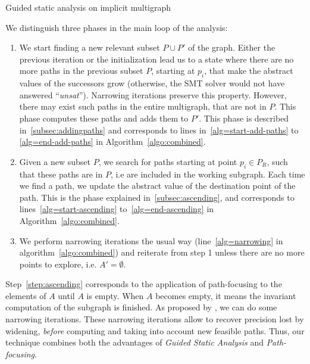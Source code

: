 \documentclass[preprint]{sigplanconf}
\newcommand{\MM}[1]{{\color{blue} TODO(MM): #1}}
\begin{document}
\begin{algorithm}
	\caption{Guided static analysis on implicit multigraph}
	\label{algo:combined}
	\begin{algorithmic}[1] 
	
	\end{algorithmic}
\end{algorithm}


We distinguish three phases in the main loop of the analysis:
\begin{enumerate}
\item \label{step:addingpaths} We start finding a new relevant subset
  $P \cup P'$ of the graph.
  Either the previous iteration or the initialization lead us to a
  state where there are no more paths in the previous subset $P$,
  starting at $p_i$, that make the abstract values of the successors
  grow (otherwise, the SMT solver would not have answered
  ``\emph{unsat}''). Narrowing iterations preserve this property.
  However, there may exist such paths in the entire multigraph, that
  are not in $P$. This phase computes these paths and adds them to
  $P'$. This phase is described in~\ref{subsec:addingpaths}
  and corresponds to lines in~\ref{alg=start-add-paths} to
  \ref{alg=end-add-paths} in Algorithm~\ref{algo:combined}.
\item \label{step:ascending} Given a new subset $P$, we search for paths starting at point
  $p_i \in P_R$, such that these paths are in $P$, i.e are included in
  the working subgraph. Each time we find a path, we update the
  abstract value of the destination point of the path. This is the
  phase explained in~\ref{subsec:ascending}, and corresponds to
  lines~\ref{alg=start-ascending} to~\ref{alg=end-ascending} in
  Algorithm~\ref{algo:combined}.
\item  \label{step:narrowing} We perform narrowing iterations the usual way
  (line~\ref{alg=narrowing} in algorithm~\ref{algo:combined}) and
  reiterate from step 1 unless there are no more points to explore,
  i.e. $A' = \emptyset$.
\end{enumerate}

%
%

Step~\ref{step:ascending} corresponds to the application of
path-focusing \cite{Monniaux_Gonnord_SAS11} to
the elements of $A$ until $A$ is empty. 
When $A$ becomes empty, it means the
invariant computation of the subgraph is finished. As proposed by
\citet{DBLP:conf/sas/GopanR07}, we can do some narrowing iterations.
These narrowing iterations allow to recover precision lost by
widening, \emph{before} computing and taking into account new feasible paths.
Thus, our technique combines both the advantages of \emph{Guided Static
Analysis} and \emph{Path-focusing}.
\end{document}
